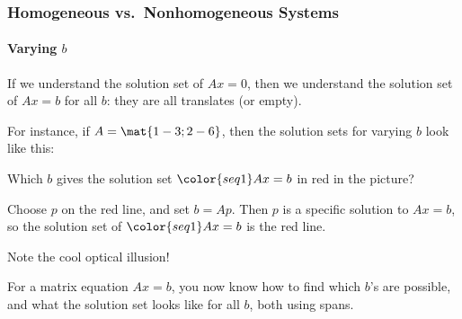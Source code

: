 \begin{frame}
\frametitle{Homogeneous vs.\ Nonhomogeneous Systems}
\framesubtitle{Varying $b$}

If we understand the solution set of $Ax=0$, then we understand the solution set
of $Ax=b$ for all $b$: they are all translates (or empty).

\pause\medskip
For instance, if $A = \mat{1 -3; 2 -6}$, then the solution sets for
varying $b$ look like this:
\medskip
\begin{center}
\quad
\pause
\begin{minipage}[c]{0.4\linewidth}
  \raggedright
  Which $b$ gives the solution set $\color{seq1}Ax=b$ in
  \textcolor{seq1}{red} in the picture?

  \pause\medskip
  Choose $p$ on the red line, and set $b=Ap$.
  Then $p$ is a specific solution to $Ax=b$, so the solution set of
  $\color{seq1}Ax=b$ is the red line.

  \pause\medskip
  Note the cool optical illusion!
\end{minipage}
\end{center}

\pause\smallskip
For a matrix equation $Ax=b$, you now know how to find which $b$'s are possible, and
what the solution set looks like for all $b$, both using spans.

\end{frame}


